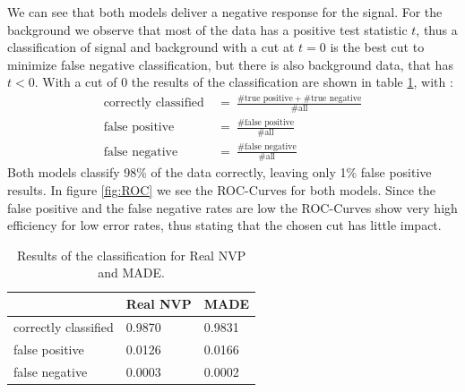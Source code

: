\documentclass[%
 reprint,
 amsmath,amssymb,
 aps,
]{revtex4-2}
\begin{document}
We can see that both models deliver a negative response for the signal. For the background we observe that most of the data has a positive test statistic $t$, thus a classification of signal and background with a cut at $t=0$ is the best cut to minimize false negative classification, but there is also background data, that has $t<0$. With a cut of 0 the results of the classification are shown in table \ref{tab: res}, with : 
\begin{align*}
\text{correctly classified}~&=~\frac{\# \text{true positive}+ \# \text{true negative}}{\# \text{all}}\\ \text{false positive}~&=~\frac{\# \text{false positive}}{\# \text{all}}\\
\text{false negative}~&=~\frac{\# \text{false negative}}{\# \text{all}}
\end{align*}
Both models classify 98\% of the data correctly, leaving only 1\% false positive results.
 In figure \ref{fig:ROC} we see the ROC-Curves for both models. Since the false positive and the false negative rates are low the ROC-Curves show very high efficiency for low error rates, thus stating that the chosen cut has little impact.
\begin{table}
	\centering
	\begin{tabular}{|l|l|l|}
		\hline
		& Real NVP& MADE \\
		\hline
		correctly classified & 0.9870  & 0.9831\\
		\hline
		false positive &0.0126 & 0.0166 \\
		\hline
		false negative &0.0003 & 0.0002\\
		\hline
	\end{tabular}
	\caption{Results of the classification for Real NVP and MADE. \label{tab: res}}
\end{table}
\end{document}
